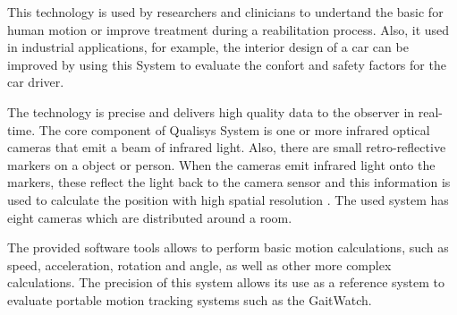 This technology is used by researchers and clinicians to undertand the basic for human motion or improve treatment during a reabilitation process. Also, it used in industrial applications, for example, the interior design of a car can be improved by using this System to evaluate the confort and safety factors for the car driver. \cite{Qualisys}

The technology is precise and delivers high quality data to the observer in real-time. The core component of Qualisys System is one or more infrared optical cameras that emit a beam of infrared light. Also, there are small retro-reflective markers on a object or person. When the cameras emit infrared light onto the markers, these reflect the light back to the camera sensor and this information is used to calculate the position with high spatial resolution  \cite{Qualisys}. The used system has eight cameras which are distributed around a room.

The provided software tools allows to perform basic motion calculations,
such as speed, acceleration, rotation and angle, as well as other more complex
calculations. The precision of this system allows its use as a reference system to evaluate portable motion tracking systems such as the GaitWatch.  \cite{OlivaresBotzel2013}
